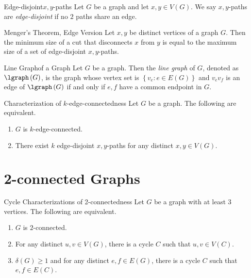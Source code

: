 \documentclass[co342]{subfiles}
\begin{document}
    \begin{definition}{Edge-disjoint}{$x,y$-paths}
        Let $G$ be a graph and let $x,y\in V\left( G \right)$. We say $x,y$-paths are \emph{edge-disjoint} if no $2$ paths share an edge.
    \end{definition}

    \begin{theorem}{Menger's Theorem, Edge Version}
        Let $x,y$ be distinct vertices of a graph $G$. Then the minimum size of a cut that disconnects $x$ from $y$ is equal to the maximum size of a set of edge-disjoint $x,y$-paths.
    \end{theorem}

    \begin{definition}{Line Graph}{of a Graph}
        Let $G$ be a graph. Then the \emph{line graph} of $G$, denoted as $\lgraph\left( G \right)$, is the graph whose vertex set is $\left\lbrace v_e:e\in E\left( G \right) \right\rbrace$ and $v_ev_f$ is an edge of $\lgraph\left( G \right)$ if and only if $e,f$ have a common endpoint in $G$.
    \end{definition}

    \clearpage
    \begin{cor}{Characterization of $k$-edge-connectedness}
        Let $G$ be a graph. The following are equivalent.
        \begin{enumerate}
            \item $G$ is $k$-edge-connected.
            \item There exist $k$ edge-disjoint $x,y$-paths for any distinct $x,y\in V\left( G \right)$.
        \end{enumerate}
    \end{cor}	

    \section{2-connected Graphs}
    
    \begin{prop}{Cycle Characterizations of 2-connectedness}
        Let $G$ be a graph with at least $3$ vertices. The following are equivalent.
        \begin{enumerate}
            \item $G$ is $2$-connected.
            \item For any distinct $u,v\in V\left( G \right)$, there is a cycle $C$ such that $u,v\in V\left( C \right)$.
            \item $\delta\left( G \right)\geq 1$ and for any distinct $e,f\in E\left( G \right)$, there is a cycle $C$ such that $e,f\in E\left( C \right)$.
        \end{enumerate}
    \end{prop}
\end{document}
